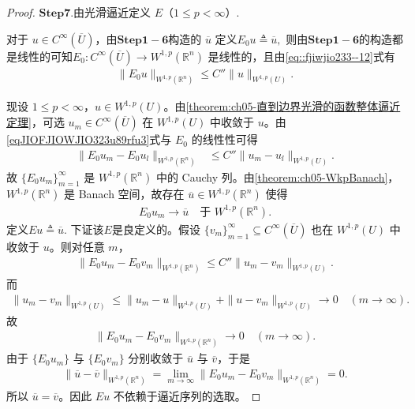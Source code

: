 \documentclass[../../main.tex]{subfiles}%
\begin{document}
\begin{proof}
\noindent$\mathbf{Step}\bm{7}$.{\heiti 由光滑逼近定义 \(E\)（\(1\leqslant p<\infty\)）.}

对于 \(u\in C^{\infty}(\overline{U})\)，由$\mathbf{Step 1-6}$构造的 \(\overline{u}\) 定义$E_0 u\triangleq \overline{u},$
则由$\mathbf{Step 1-6}$的构造都是线性的可知\(E_0:C^{\infty}(\overline{U})\to W^{1,p}(\mathbb{R}^n)\) 是线性的，且由\eqref{eq::fjiwjio233--12}式有
\begin{align}\label{eqJIOFJIOWJIO323u89rfu3}
\|E_0 u\|_{W^{1,p}(\mathbb{R}^n)}\leqslant C''\|u\|_{W^{1,p}(U)}.
\end{align}

现设 \(1\leqslant p<\infty\)，\(u\in W^{1,p}(U)\)。由\cref{theorem:ch05-直到边界光滑的函数整体逼近定理}，可选 \(u_m\in C^{\infty}(\overline{U})\) 在 \(W^{1,p}(U)\) 中收敛于 \(u\)。由\eqref{eqJIOFJIOWJIO323u89rfu3}式与 \(E_0\) 的线性性可得
\begin{align*}
\|E_0 u_m-E_0 u_l\|_{W^{1,p}(\mathbb{R}^n)}
&\leqslant C''\|u_m-u_l\|_{W^{1,p}(U)}.
\end{align*}
故 \(\{E_0 u_m\}_{m=1}^{\infty}\) 是 \(W^{1,p}(\mathbb{R}^n)\) 中的 Cauchy 列。由\cref{theorem:ch05-WkpBanach}，\(W^{1,p}(\mathbb{R}^n)\) 是 Banach 空间，故存在 \(\overline{u}\in W^{1,p}(\mathbb{R}^n)\) 使得
\begin{align*}
E_0 u_m\to \overline{u}\quad \text{于 } W^{1,p}(\mathbb{R}^n).
\end{align*}
定义$E u\triangleq \overline{u}.$
下证该$E$是良定义的。假设 \(\{v_m\}_{m=1}^{\infty}\subseteq C^{\infty}(\overline{U})\) 也在 \(W^{1,p}(U)\) 中收敛于 \(u\)。则对任意 \(m\)，
\begin{align*}
\|E_0 u_m-E_0 v_m\|_{W^{1,p}(\mathbb{R}^n)}
\leqslant C''\|u_m-v_m\|_{W^{1,p}(U)}.
\end{align*}
而
\begin{align*}
\|u_m-v_m\|_{W^{1,p}(U)}
\leqslant \|u_m-u\|_{W^{1,p}(U)}+\|u-v_m\|_{W^{1,p}(U)}\to 0\quad (m\to\infty).
\end{align*}
故
\begin{align*}
\|E_0 u_m-E_0 v_m\|_{W^{1,p}(\mathbb{R}^n)}\to 0\quad (m\to\infty).
\end{align*}
由于 \(\{E_0 u_m\}\) 与 \(\{E_0 v_m\}\) 分别收敛于 \(\overline{u}\) 与 \(\overline{v}\)，于是
\begin{align*}
\|\overline{u}-\overline{v}\|_{W^{1,p}(\mathbb{R}^n)}
=\lim\limits_{m\to\infty}\|E_0 u_m-E_0 v_m\|_{W^{1,p}(\mathbb{R}^n)}=0.
\end{align*}
所以 \(\overline{u}=\overline{v}\)。因此 \(E u\) 不依赖于逼近序列的选取。


\end{proof}
\end{document}
